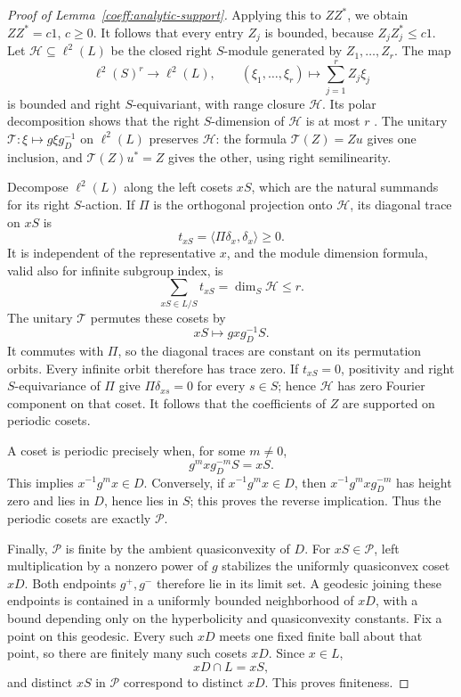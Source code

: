 \begin{proof}[Proof of Lemma~\ref{coeff:analytic-support}]
Applying this to \(ZZ^*\), we obtain \(ZZ^*=c1\), \(c\ge0\).
It follows that every entry \(Z_j\) is bounded, because
\(Z_jZ_j^*\le c1\).  Let \(\mathcal H\subseteq\ell^2(L)\) be the
closed right \(S\)-module generated by \(Z_1,\ldots,Z_r\).
The map
\[
 \ell^2(S)^r\longrightarrow\ell^2(L),\qquad
 (\xi_1,\ldots,\xi_r)\longmapsto\sum_{j=1}^r Z_j\xi_j
\]
is bounded and right \(S\)-equivariant, with range closure
\(\mathcal H\).  Its polar decomposition shows that the right
\(S\)-dimension of \(\mathcal H\) is at most \(r\)
\cite[Definitions~1.8 and~1.10, Theorem~1.9(6)]{Lueck2002}.
The unitary \(\mathcal T:\xi\mapsto g\xi g_D^{-1}\) on
\(\ell^2(L)\) preserves \(\mathcal H\): the formula
\(\mathcal T(Z)=Zu\) gives one inclusion, and
\(\mathcal T(Z)u^*=Z\) gives the other, using right semilinearity.

Decompose \(\ell^2(L)\) along the left cosets \(xS\), which are the
natural summands for its right \(S\)-action.  If \(\Pi\) is the
orthogonal projection onto \(\mathcal H\), its diagonal trace on
\(xS\) is
\[
 t_{xS}=\langle\Pi\delta_x,\delta_x\rangle\ge0.
\]
It is independent of the representative \(x\), and the module
dimension formula, valid also for infinite subgroup index, is
\[
 \sum_{xS\in L/S}t_{xS}=\dim_S\mathcal H\le r.
\]
The unitary \(\mathcal T\) permutes these cosets by
\[
 xS\longmapsto gxg_D^{-1}S.
\]
It commutes with \(\Pi\), so the diagonal traces are constant on
its permutation orbits.  Every infinite orbit therefore has trace
zero.  If \(t_{xS}=0\), positivity and right \(S\)-equivariance of
\(\Pi\) give \(\Pi\delta_{xs}=0\) for every \(s\in S\);
hence \(\mathcal H\) has zero Fourier component on that coset.
It follows that the coefficients of \(Z\) are supported on periodic
cosets.

A coset is periodic precisely when, for some \(m\ne0\),
\[
 g^mxg_D^{-m}S=xS.
\]
This implies \(x^{-1}g^mx\in D\).
Conversely, if \(x^{-1}g^mx\in D\), then
\(x^{-1}g^mxg_D^{-m}\) has height zero and lies in \(D\), hence lies
in \(S\); this proves the reverse implication.  Thus the periodic
cosets are exactly \(\mathcal P\).

Finally, \(\mathcal P\) is finite by the ambient quasiconvexity of
\(D\).  For \(xS\in\mathcal P\), left multiplication by a nonzero
power of \(g\) stabilizes the uniformly quasiconvex coset \(xD\).
Both endpoints \(g^+,g^-\) therefore lie in its limit set.
A geodesic joining these endpoints is contained in a uniformly
bounded neighborhood of \(xD\), with a bound depending only on
the hyperbolicity and quasiconvexity constants.  Fix a point on
this geodesic.  Every such \(xD\) meets one fixed finite ball
about that point, so there are finitely many such cosets \(xD\).
Since \(x\in L\),
\[
 xD\cap L=xS,
\]
and distinct \(xS\) in \(\mathcal P\) correspond to distinct \(xD\).
This proves finiteness.


\end{proof}
